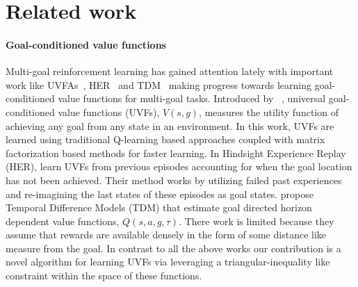 
\section{Related work}

\paragraph{Goal-conditioned value functions}
Multi-goal reinforcement learning has gained attention lately with
important work like UVFAs~\citep{schaul2015universal},
HER~\citep{andrychowicz2016learning} and TDM~\citep{pong2018temporal}
making progress towards learning goal-conditioned value functions for
multi-goal tasks.  Introduced by ~\citep{schaul2015universal}, universal
goal-conditioned value functions (UVFs), $V(s,g)$, measures the utility
function of achieving any goal from any state in an environment. In this
work, UVFs are learned using traditional Q-learning based approaches
coupled with matrix factorization based methods for faster learning.
In Hindsight Experience Replay (HER), \citet{andrychowicz2016learning}
learn UVFs from previous episodes
accounting for when the goal location has not been achieved.  Their
method works by utilizing failed past experiences and re-imagining 
the last states of these episodes as goal states.
\citet{pong2018temporal} propose Temporal Difference Models (TDM) that estimate
goal directed horizon dependent value functions, $Q(s, a, g, \tau)$. There work is
limited because they assume that rewards are available densely in the form of
some distance like measure from the goal.
In contrast to all the above works our contribution is a novel algorithm for
learning UVFs via leveraging a triangular-inequality like constraint within the
space of these functions.

